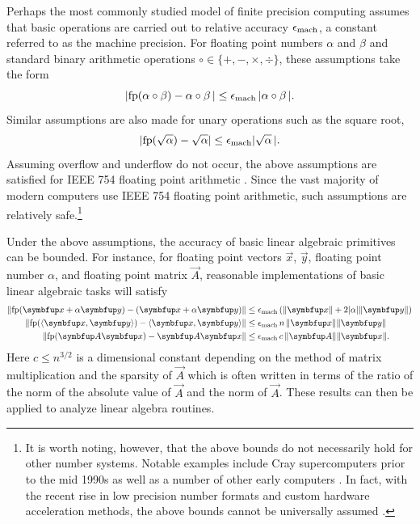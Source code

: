 Perhaps the most commonly studied model of finite precision computing assumes that basic operations are carried out to relative accuracy \( \epsilon_{\textup{mach}} \), a constant referred to as the machine precision.
For floating point numbers \( \alpha \) and \( \beta \) and standard binary arithmetic operations \( \circ \in \{ +, -, \times, \div \} \), these assumptions take the form
\begin{equation*}
    | \!\operatorname{fp}( \alpha \circ \beta ) - \alpha \circ \beta \,|
    \leq \epsilon_{\textup{mach}} \, | \alpha \circ \beta \,|.
\end{equation*}
Similar assumptions are also made for unary operations such as the square root,
\begin{equation*}
     | \!\operatorname{fp}(\sqrt{\alpha}) - \sqrt{\alpha} | \leq \epsilon_{\textup{mach}} | \sqrt{\alpha} \,|.
\end{equation*}
Assuming overflow and underflow do not occur, the above assumptions are satisfied for IEEE 754 floating point arithmetic \cite{ieee_19}.
Since the vast majority of modern computers use IEEE 754 floating point arithmetic, such assumptions are relatively safe.\footnote{It is worth noting, however, that the above bounds do not necessarily hold for other number systems.
Notable examples include Cray supercomputers prior to the mid 1990s as well as a number of other early computers \cite{higham_02}.
In fact, with the recent rise in low precision number formats and custom hardware acceleration methods, the above bounds cannot be universally assumed \cite{fasi_higham_mikaitis_pranesh_21}.}

Under the above assumptions, the accuracy of basic linear algebraic primitives can be bounded. 
For instance, for floating point vectors \( \vec{x} \), \( \vec{y} \), floating point number \( \alpha \), and floating point matrix \( \vec{A} \), reasonable implementations of basic linear algebraic tasks \cite{higham_02} will satisfy
\begin{align*}
    \| \!\operatorname{fp}(\vec{x} + \alpha \vec{y}) - (\vec{x} + \alpha \vec{y}) \| 
    &\leq \epsilon_{\textup{mach}} \, ( \|\vec{x}\| + 2 |\alpha | \|\vec{y}\| ) \\
    \| \!\operatorname{fp}(\langle \vec{x}, \vec{y} \rangle ) - \langle \vec{x}, \vec{y} \rangle \| 
    &\leq \epsilon_{\textup{mach}} \,  n \, \|\vec{x}\| \|\vec{y}\| \\
    \| \!\operatorname{fp}(\vec{A} \vec{x}) - \vec{A} \vec{x} \| 
    &\leq \epsilon_{\textup{mach}}\, c \, \|\vec{A}\| \|\vec{x}\|.
\end{align*}
Here \( c \leq n^{3/2} \) is a dimensional constant depending on the method of matrix multiplication and the sparsity of \( \vec{A} \) which is often written in terms of the ratio of the norm of the absolute value of \( \vec{A} \) and the norm of \( \vec{A} \).
These results can then be applied to analyze linear algebra routines.


